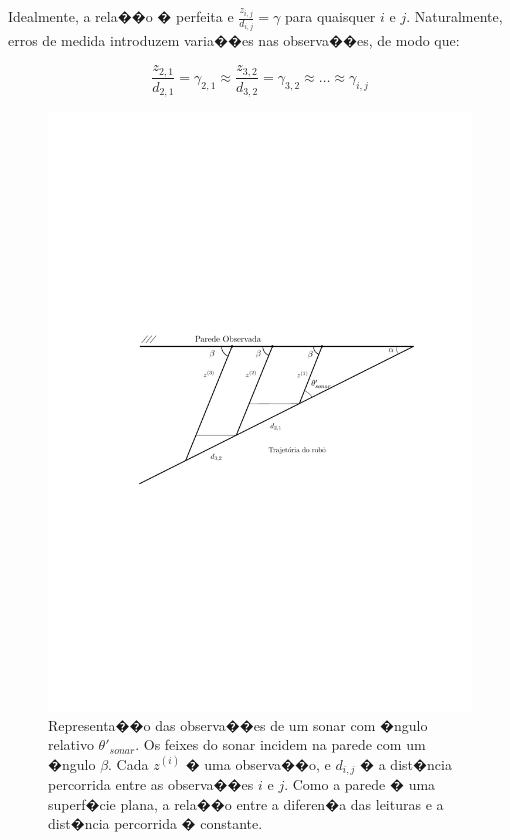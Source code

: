 Idealmente, a rela��o � perfeita e $\frac{z_{i,j}}{d_{i,j}} = \gamma$ para quaisquer $i$ e $j$. Naturalmente, erros de medida introduzem varia��es nas observa��es, de modo que:

\begin{equation}
\frac{z_{2,1}}{d_{2,1}} = \gamma_{2,1} \approx \frac{z_{3,2}}{d_{3,2}} = \gamma_{3,2} \approx \dots \approx \gamma_{i, j}
\end{equation}

\begin{figure}
	\centering
		\includegraphics{imagens/sonar/modelo_sonar.pdf}
		\caption{Representa��o das observa��es de um sonar com �ngulo relativo $\theta'_{sonar}$. Os feixes do sonar incidem na parede com um �ngulo $\beta$. Cada $z^{(i)}$ � uma observa��o, e $d_{i,j}$ � a dist�ncia percorrida entre as observa��es $i$ e $j$. Como a parede � uma superf�cie plana, a rela��o entre a diferen�a das leituras e a dist�ncia percorrida � constante.}
	\label{fig:modelo_sonar}
\end{figure}

